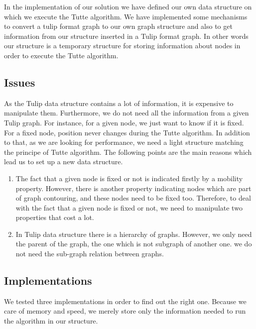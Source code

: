 In the implementation of our solution we have defined our own data
structure on which we execute the Tutte algorithm. We have
implemented some mechanisms to convert a tulip format graph to our own
graph structure and also to get information from our structure
inserted in a Tulip format graph. In other words our structure is a
temporary structure for storing information about nodes in order to
execute the Tutte algorithm.

\subsection{Issues}
As the Tulip data structure contains a lot of information, it is
expensive to manipulate them. Furthermore, we do not need all the
information from a given Tulip graph. For
instance, for a given node, we just want to know if it is fixed. For a
fixed node, position never changes during the Tutte algorithm. In
addition to that, as we are looking for performance, we need a light
structure matching the principe of Tutte algorithm. The following
points are the main reasons which lead us to set up a new data
structure.
\begin{enumerate}
\item The fact that a given node is fixed or not is indicated firstly
  by a mobility property. However, there is another property indicating
  nodes which are part of graph contouring, and these nodes need to be
  fixed too. Therefore, to deal with the fact that a given node is fixed or
  not, we need to manipulate two properties that cost a lot.

\item In Tulip data structure there is a hierarchy of graphs. However, we only need
  the parent of the graph, the one which is not subgraph of another
  one. we do not need the sub-graph relation between graphs.


\end{enumerate}  

\subsection{Implementations}
We tested three implementations in order to find out the right one. Because we care of memory and speed, we merely store only the information needed to run the algorithm in our structure.

